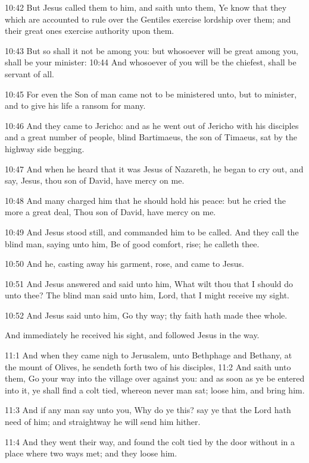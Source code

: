 10:42 But Jesus called them to him, and saith unto them, Ye know that
they which are accounted to rule over the Gentiles exercise lordship
over them; and their great ones exercise authority upon them.

10:43 But so shall it not be among you: but whosoever will be great
among you, shall be your minister: 10:44 And whosoever of you will be
the chiefest, shall be servant of all.

10:45 For even the Son of man came not to be ministered unto, but to
minister, and to give his life a ransom for many.

10:46 And they came to Jericho: and as he went out of Jericho with his
disciples and a great number of people, blind Bartimaeus, the son of
Timaeus, sat by the highway side begging.

10:47 And when he heard that it was Jesus of Nazareth, he began to cry
out, and say, Jesus, thou son of David, have mercy on me.

10:48 And many charged him that he should hold his peace: but he cried
the more a great deal, Thou son of David, have mercy on me.

10:49 And Jesus stood still, and commanded him to be called. And they
call the blind man, saying unto him, Be of good comfort, rise; he
calleth thee.

10:50 And he, casting away his garment, rose, and came to Jesus.

10:51 And Jesus answered and said unto him, What wilt thou that I
should do unto thee? The blind man said unto him, Lord, that I might
receive my sight.

10:52 And Jesus said unto him, Go thy way; thy faith hath made thee
whole.

And immediately he received his sight, and followed Jesus in the way.

11:1 And when they came nigh to Jerusalem, unto Bethphage and Bethany,
at the mount of Olives, he sendeth forth two of his disciples, 11:2
And saith unto them, Go your way into the village over against you:
and as soon as ye be entered into it, ye shall find a colt tied,
whereon never man sat; loose him, and bring him.

11:3 And if any man say unto you, Why do ye this? say ye that the Lord
hath need of him; and straightway he will send him hither.

11:4 And they went their way, and found the colt tied by the door
without in a place where two ways met; and they loose him.

